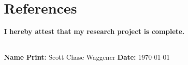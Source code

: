 \documentclass[12pt]{article}
\begin{document}
\pagebreak
\section{References}
\noindent
\renewcommand{\refname}{}



\vspace{4\baselineskip}
\noindent
\textbf{I hereby attest that my research project is complete.}

\vspace{1cm}
\\
\noindent \textbf{Name Print:} Scott Chase Waggener \hfill \textbf{Date:} \today
\end{document}
